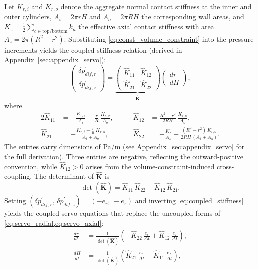 \documentclass[a4paper,fleqn]{cas-sc}
\begin{document}
Let $K_{r,i}$ and $K_{r,o}$ denote the aggregate normal contact stiffness at the inner and outer cylinders, $A_i=2\pi rH$ and $A_o=2\pi RH$ the corresponding wall areas, and $K_z=\frac{1}{2}\sum_{c\in\mathrm{top/bottom}} k_n$ the effective axial contact stiffness with area $A_z=2\pi(R^2-r^2)$. Substituting \cref{eq:const_volume_constraint} into the pressure increments yields the coupled stiffness relation (derived in Appendix~\ref{sec:appendix_servo}):
\begin{equation}
\begin{pmatrix} \delta p_{dif,r}^{\prime} \\[4pt] \delta p_{dif,z}^{\prime} \end{pmatrix}
=
\underbrace{\begin{pmatrix} \hat{K}_{11} & \hat{K}_{12} \\[6pt] \hat{K}_{21} & \hat{K}_{22} \end{pmatrix}}_{\hat{\mathbf{K}}}
\begin{pmatrix} dr \\[4pt] dH \end{pmatrix},
\label{eq:coupled_stiffness}
\end{equation}
where
\begin{alignat}{2}
\hat{K}_{11} &= -\frac{K_{r,i}}{A_i}-\frac{r}{R}\,\frac{K_{r,o}}{A_o}, &\qquad
\hat{K}_{12} &= \frac{R^2-r^2}{2RH}\,\frac{K_{r,o}}{A_o}, \label{eq:Khat_main_row1}\\[4pt]
\hat{K}_{21} &= -\frac{K_{r,i}-\frac{r}{R}\,K_{r,o}}{A_i+A_o}, &\qquad
\hat{K}_{22} &= -\frac{K_z}{A_z}-\frac{(R^2-r^2)\,K_{r,o}}{2RH\,(A_i+A_o)}. \label{eq:Khat_main_row2}
\end{alignat}
The entries carry dimensions of Pa/m (see Appendix~\ref{sec:appendix_servo} for the full derivation). Three entries are negative, reflecting the outward-positive convention, while $\hat{K}_{12}>0$ arises from the volume-constraint-induced cross-coupling. The determinant of $\hat{\mathbf{K}}$ is
\begin{equation}
\det(\hat{\mathbf{K}}) = \hat{K}_{11}\,\hat{K}_{22} - \hat{K}_{12}\,\hat{K}_{21}.
\label{eq:det_K_main}
\end{equation}
Setting $(\delta p_{dif,r}^{\prime},\,\delta p_{dif,z}^{\prime})=(-e_r,\,-e_z)$ and inverting \cref{eq:coupled_stiffness} yields the coupled servo equations that replace the uncoupled forms of \cref{eq:servo_radial,eq:servo_axial}:
\begin{align}
\frac{dr}{dt} &= \frac{1}{\det(\hat{\mathbf{K}})}\!\left(-\hat{K}_{22}\,\frac{e_r}{\Delta t} + \hat{K}_{12}\,\frac{e_z}{\Delta t}\right), \label{eq:servo_dr}\\[6pt]
\frac{dH}{dt} &= \frac{1}{\det(\hat{\mathbf{K}})}\!\left(\hat{K}_{21}\,\frac{e_r}{\Delta t} - \hat{K}_{11}\,\frac{e_z}{\Delta t}\right), \label{eq:servo_dH}
\end{align}
\end{document}
